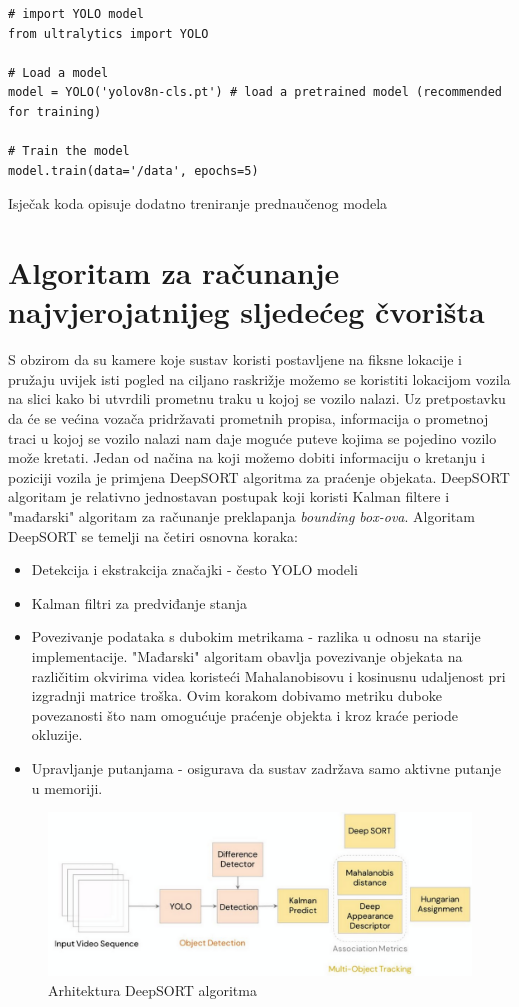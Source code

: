 \documentclass[seminarski, times, utf8]{fer}
\begin{document}
\begin{verbatim}
# import YOLO model
from ultralytics import YOLO

# Load a model
model = YOLO('yolov8n-cls.pt') # load a pretrained model (recommended for training)

# Train the model
model.train(data='/data', epochs=5)
\end{verbatim}
\begin{flushleft}
  \small
  Isječak koda opisuje dodatno treniranje prednaučenog modela 
\end{flushleft}

\section{Algoritam za računanje najvjerojatnijeg sljedećeg čvorišta}
S obzirom da su kamere koje sustav koristi postavljene na fiksne lokacije i pružaju uvijek isti pogled na ciljano raskrižje možemo se koristiti lokacijom vozila na slici kako bi utvrdili prometnu traku u kojoj se vozilo nalazi. Uz pretpostavku da će se većina vozača pridržavati prometnih propisa, informacija o prometnoj traci u kojoj se vozilo nalazi nam daje moguće puteve kojima se pojedino vozilo može kretati. Jedan od načina na koji možemo dobiti informaciju o kretanju i poziciji vozila je primjena DeepSORT algoritma za praćenje objekata. DeepSORT algoritam je relativno jednostavan postupak koji koristi Kalman filtere i "mađarski" algoritam za računanje preklapanja \textit{bounding box-ova}. \citep{wojke2017simple} Algoritam DeepSORT se temelji na četiri osnovna koraka:
\begin{itemize}
	\item Detekcija i ekstrakcija značajki - često YOLO modeli
	\item Kalman filtri za predviđanje stanja
	\item Povezivanje podataka s dubokim metrikama - razlika u odnosu na starije implementacije. "Mađarski" algoritam obavlja povezivanje objekata na različitim okvirima videa koristeći Mahalanobisovu i kosinusnu udaljenost pri izgradnji matrice troška. Ovim korakom dobivamo metriku duboke povezanosti što nam omogućuje praćenje objekta i kroz kraće periode okluzije. 
	\item Upravljanje putanjama - osigurava da sustav zadržava samo aktivne putanje u memoriji. \citep{kouidri2023mastering}
\end{itemize} 
\begin{figure}[H]
   \centering
   \includegraphics[width=0.7\linewidth]{slike/img5.png}
   \caption{Arhitektura DeepSORT algoritma}
   \label{fig:yolo}
\end{figure}
\end{document}
